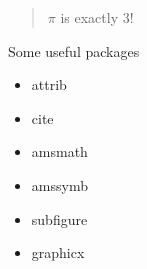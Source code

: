\documentclass{article}
\begin{document}
\begin{quotation}
$\pi$ is exactly 3!
\end{quotation}

\begin{table}[!b]
\caption{Some useful packages}
\begin{itemize}
    \item attrib
    \item cite
    \item amsmath
    \item amssymb
    \item subfigure
    \item graphicx
\end{itemize}
\end{table}
\end{document}
